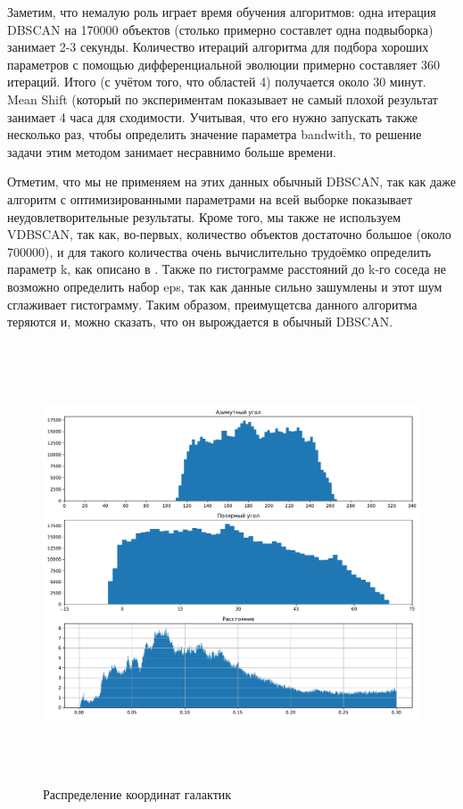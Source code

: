 \documentclass[12pt,fleqn]{article}
\begin{document}
Заметим, что немалую роль играет время обучения алгоритмов: одна итерация DBSCAN на 170000 объектов (столько примерно составлет одна подвыборка) занимает 2-3 секунды. Количество итераций алгоритма для подбора хороших параметров с помощью дифференциальной эволюции примерно составляет 360 итераций. Итого (с учётом того, что областей 4) получается около 30 минут.
Mean Shift (который по экспериментам показывает не самый плохой результат занимает 4 часа для сходимости. Учитывая, что его нужно запускать также несколько раз, чтобы определить значение параметра bandwith, то решение задачи этим методом занимает несравнимо больше времени.

Отметим, что  мы не применяем на этих данных обычный DBSCAN, так как даже алгоритм с оптимизированными параметрами на всей выборке показывает неудовлетворительные результаты. Кроме того, мы также не используем VDBSCAN, так как, во-первых, количество объектов достаточно большое (около 700000), и для такого количества очень вычислительно трудоёмко определить  параметр k, как описано в \cite{VDBSCAN}. Также по гистограмме расстояний до k-го соседа не возможно определить набор eps, так как данные сильно зашумлены и этот шум сглаживает гистограмму. Таким образом, преимущетсва данного алгоритма теряются и, можно сказать, что он вырождается в обычный DBSCAN.



\begin{figure}[]
  \centering
  \includegraphics[width=12cm, height=13cm]{distrib.pdf}
  \caption{Распределение координат галактик}
  \label{distrib_coords}
\end{figure}
\end{document}
